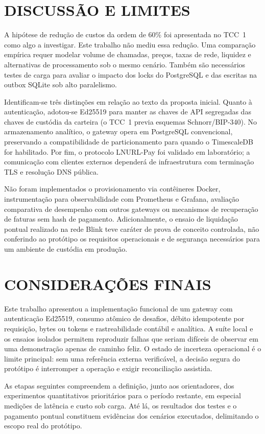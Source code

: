 \documentclass[openright]{normas-utf-tex}
\begin{document}
\chapter{DISCUSSÃO E LIMITES}
A hipótese de redução de custos da ordem de 60\% foi apresentada no TCC~1 como algo a investigar. Este trabalho não mediu essa redução. Uma comparação empírica requer modelar volume de chamadas, preços, taxas de rede, liquidez e alternativas de processamento sob o mesmo cenário. Também são necessários testes de carga para avaliar o impacto dos locks do PostgreSQL e das escritas na outbox SQLite sob alto paralelismo.

Identificam-se três distinções em relação ao texto da proposta inicial. Quanto à autenticação, adotou-se Ed25519 para manter as chaves de API segregadas das chaves de custódia da carteira (o TCC~1 previa esquemas Schnorr/BIP-340). No armazenamento analítico, o gateway opera em PostgreSQL convencional, preservando a compatibilidade de particionamento para quando o TimescaleDB for habilitado. Por fim, o protocolo LNURL-Pay foi validado em laboratório; a comunicação com clientes externos dependerá de infraestrutura com terminação TLS e resolução DNS pública.

Não foram implementados o provisionamento via contêineres Docker, instrumentação para observabilidade com Prometheus e Grafana, avaliação comparativa de desempenho com outros gateways ou mecanismos de recuperação de faturas sem hash de pagamento. Adicionalmente, o ensaio de liquidação pontual realizado na rede Blink teve caráter de prova de conceito controlada, não conferindo ao protótipo os requisitos operacionais e de segurança necessários para um ambiente de custódia em produção.

\chapter{CONSIDERAÇÕES FINAIS}
Este trabalho apresentou a implementação funcional de um gateway com autenticação Ed25519, consumo atômico de desafios, débito idempotente por requisição, bytes ou tokens e rastreabilidade contábil e analítica. A suíte local e os ensaios isolados permitem reproduzir falhas que seriam difíceis de observar em uma demonstração apenas de caminho feliz. O estado de incerteza operacional é o limite principal: sem uma referência externa verificável, a decisão segura do protótipo é interromper a operação e exigir reconciliação assistida.

As etapas seguintes compreendem a definição, junto aos orientadores, dos experimentos quantitativos prioritários para o período restante, em especial medições de latência e custo sob carga. Até lá, os resultados dos testes e o pagamento pontual constituem evidências dos cenários executados, delimitando o escopo real do protótipo.
\end{document}
